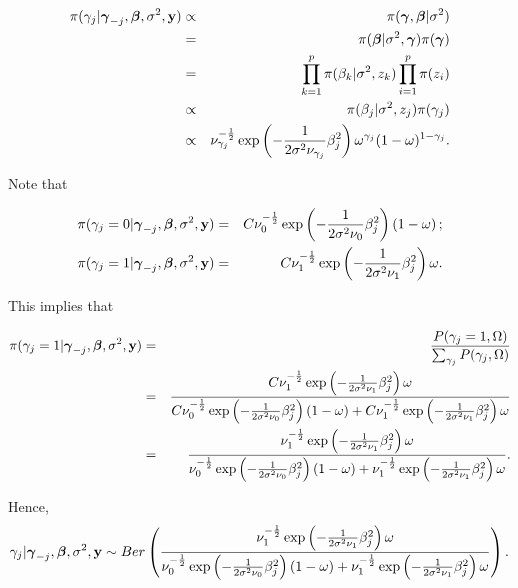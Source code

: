 \documentclass[]{book}
\begin{document}
\begin{eqnarray*}
\pi(\gamma_j|{\boldsymbol \gamma}_{-j}, {\boldsymbol \beta}, \sigma^2, {\bf y})&\propto& \pi({\boldsymbol \gamma},{\boldsymbol \beta}|\sigma^2)\\
&=&\pi({\boldsymbol \beta}|\sigma^2, {\boldsymbol \gamma})\pi({\boldsymbol \gamma})\\
&=& \prod_{k=1}^{p}\pi(\beta_{k}|\sigma^2, z_{k})\prod_{i=1}^{p}\pi(z_i)\\
&\propto&\pi(\beta_{j}|\sigma^2, z_{j})\pi(\gamma_j)\\
&\propto&\nu_{\gamma_j}^{-\frac{1}{2}}\exp\left(-\frac{1}{2\sigma^2\nu_{\gamma_j}}\beta_j^2\right)\omega^{\gamma_j}
(1-\omega)^{1-\gamma_j}.
\end{eqnarray*}

Note that

\begin{eqnarray*}
\pi(\gamma_j = 0|{\boldsymbol \gamma}_{-j}, {\boldsymbol \beta}, \sigma^2, {\bf y})&=& C \nu_0^{-\frac{1}{2}}\exp\left(-\frac{1}{2\sigma^2\nu_0}\beta_j^2\right)\left(1-\omega\right);\\
\pi(\gamma_j = 1|{\boldsymbol \gamma}_{-j}, {\boldsymbol \beta}, \sigma^2, {\bf y})&=& C \nu_1^{-\frac{1}{2}}\exp\left(-\frac{1}{2\sigma^2\nu_1}\beta_j^2\right)\omega.
\end{eqnarray*}

This implies that

\begin{eqnarray*}
\pi(\gamma_j = 1|{\boldsymbol \gamma}_{-j}, {\boldsymbol \beta}, \sigma^2, {\bf y})
&=&\frac{P(\gamma_j = 1,\Omega)}{\sum_{\gamma_j}P(\gamma_j,\Omega)}\\
&=& \frac{C \nu_1^{-\frac{1}{2}}\exp\left(-\frac{1}{2\sigma^2\nu_1}\beta_j^2\right)\omega}
{ C \nu_0^{-\frac{1}{2}}\exp\left(-\frac{1}{2\sigma^2\nu_0}\beta_j^2\right)\left(1-\omega\right)+
C \nu_1^{-\frac{1}{2}}\exp\left(-\frac{1}{2\sigma^2\nu_1}\beta_j^2\right)\omega}\\
&=& \frac{ \nu_1^{-\frac{1}{2}}\exp\left(-\frac{1}{2\sigma^2\nu_1}\beta_j^2\right)\omega}
{  \nu_0^{-\frac{1}{2}}\exp\left(-\frac{1}{2\sigma^2\nu_0}\beta_j^2\right)\left(1-\omega\right)+
 \nu_1^{-\frac{1}{2}}\exp\left(-\frac{1}{2\sigma^2\nu_1}\beta_j^2\right)\omega}.
\end{eqnarray*}

Hence,
\[
\gamma_j |{\boldsymbol \gamma}_{-j}, {\boldsymbol \beta}, \sigma^2, {\bf y}\sim Ber\left(\frac{ \nu_1^{-\frac{1}{2}}
    \exp\left(-\frac{1}{2\sigma^2\nu_1}\beta_j^2\right)\omega}
{  \nu_0^{-\frac{1}{2}}\exp\left(-\frac{1}{2\sigma^2\nu_0}\beta_j^2\right)\left(1-\omega\right)+
 \nu_1^{-\frac{1}{2}}\exp\left(-\frac{1}{2\sigma^2\nu_1}\beta_j^2\right)\omega}\right).
\]
\end{document}
